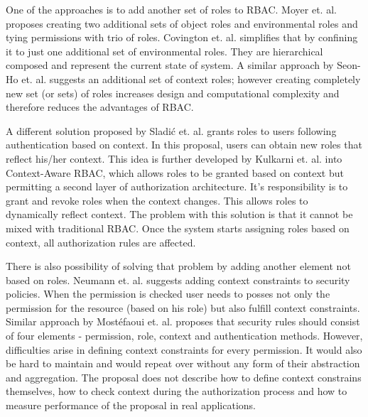\documentclass{sig-alternate-05-2015}
\begin{document}
One of the approaches is to add another set of roles to RBAC. Moyer et. al. \cite{grbac} proposes creating two additional sets of object roles and environmental roles and tying permissions with trio of roles. Covington et. al. \cite{envroles} simplifies that by confining it to just one additional set of environmental roles. They are hierarchical composed and represent the current state of system. A similar approach by Seon-Ho et. al. \cite{contextroles} suggests an additional set of context roles; however creating completely new set (or sets) of roles increases design and computational complexity and therefore reduces the advantages of RBAC.

A different solution proposed by Sladi\'c et. al. \cite{contextaccess} grants roles to users following authentication based on context. In this proposal, users can obtain new roles that reflect his/her context. This idea is further developed by  Kulkarni et. al. \cite{contextawarerbac} into Context-Aware RBAC, which allows roles to be granted based on context but permitting a second layer of authorization architecture. It's responsibility is to grant and revoke roles when the context changes.  This allows roles to dynamically reflect context. The problem with this solution is that it cannot be mixed with traditional RBAC. Once the system starts assigning roles based on context, all authorization rules are affected. 

There is also possibility of solving that problem by adding another element not based on roles. Neumann et. al. \cite{xorbac} suggests adding context constraints to security policies. When the permission is checked user needs to posses not only the permission for the resource (based on his role) but also fulfill context constraints. Similar approach by Most\'efaoui et. al. \cite{genericcontext} proposes that security rules should consist of four elements - permission, role, context and authentication methods. However, difficulties arise in defining context constraints for every permission. It would also be hard to maintain and would repeat over without any form of their abstraction and aggregation. The proposal does not describe how to define context constrains themselves, how to check context during the authorization process and how to measure performance of the proposal in real applications.
\end{document}
